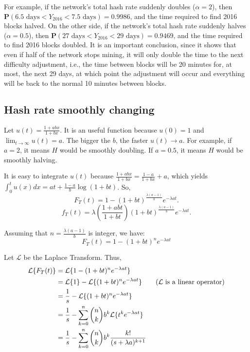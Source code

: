 For example, if the network's total hash rate suddenly doubles ($\alpha = 2$), then $\mathbf{P}(6.5 \text{ days} < Y_{2016} < 7.5 \text{ days}) = 0.9986$, and the time required to find 2016 blocks halved. On the other side, if the network's total hash rate suddenly halves ($\alpha = 0.5$), then $\mathbf{P}(27 \text{ days} < Y_{2016} < 29 \text{ days}) = 0.9469$, and the time required to find 2016 blocks doubled. It is an important conclusion, since it shows that even if half of the network stops mining, it will only double the time to the next difficulty adjustment, i.e., the time between blocks will be 20 minutes for, at most, the next 29 days, at which point the adjustment will occur and everything will be back to the normal 10 minutes between blocks.


\subsection{Hash rate smoothly changing}

Let $u(t) = \frac{1+abx}{1+bx}$. It is an useful function because $u(0) = 1$ and $\lim_{t \rightarrow \infty} u(t) = a$. The bigger the $b$, the faster $u(t) \rightarrow a$. For example, if $a=2$, it means $H$ would be smoothly doubling. If $a=0.5$, it means $H$ would be smoothly halving.

It is easy to integrate $u(t)$ because $\frac{1+abx}{1+bx} = \frac{1-a}{1+bx} + a$, which yields $\int_0^t u(x) dx = at + \frac{1-a}{b} \log(1+bt)$. So,
$$F_T(t) = 1 - (1+bt)^{\frac{\lambda(a-1)}{b}} e^{-\lambda at}.$$
$$f_T(t) = \lambda \left( \frac{1+abt}{1+bt} \right) (1+bt)^{\frac{\lambda(a-1)}{b}} e^{-\lambda at}.$$

Assuming that $n = \frac{\lambda(a-1)}{b}$ is integer, we have:
$$F_T(t) = 1 - (1+bt)^n e^{-\lambda at}$$

Let $\mathcal{L}$ be the Laplace Transform. Thus,
\begin{align*}
\mathcal{L}\{F_T(t)\} &= \mathcal{L}\{1 - (1+bt)^n e^{-\lambda at}\} \\
	&= \mathcal{L}\{1\} - \mathcal{L}\{(1+bt)^n e^{-\lambda at}\} \tag{$\mathcal{L}$ is a linear operator} \\
	&= \frac{1}{s} - \mathcal{L}\{(1+bt)^n e^{-\lambda at}\} \\
	&= \frac{1}{s} - \sum_{k=0}^n \binom{n}{k} b^k \mathcal{L}\{t^k e^{-\lambda at}\} \\
	&= \frac{1}{s} - \sum_{k=0}^n \binom{n}{k} b^k \frac{k!}{(s+\lambda a)^{k+1}}
\end{align*}

